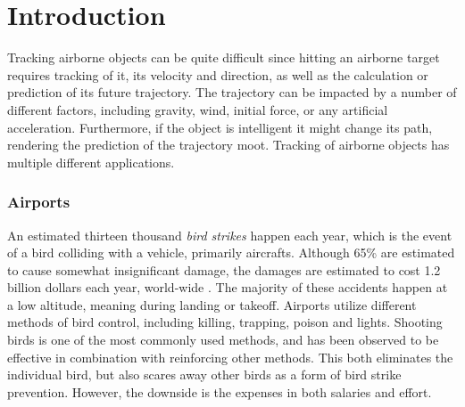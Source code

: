 
\chapter{Introduction}
Tracking airborne objects can be quite difficult since hitting an airborne target requires tracking of it, its velocity and direction, as well as the calculation or prediction of its future trajectory.
The trajectory can be impacted by a number of different factors, including gravity, wind, initial force, or any artificial acceleration.
Furthermore, if the object is intelligent it might change its path, rendering the prediction of the trajectory moot.
Tracking of airborne objects has multiple different applications.

\subsection{Airports}
An estimated thirteen thousand \textit{bird strikes} happen each year, which is the event of a bird colliding with a vehicle, primarily aircrafts\cite{WildlifeStrikeReport}.
Although 65\% are estimated to cause somewhat insignificant damage, the damages are estimated to cost 1.2 billion dollars each year, world-wide \cite{CostOfBirdstrikes}.
The majority of these accidents happen at a low altitude, meaning during landing or takeoff\cite{CostOfBirdstrikes}.
Airports utilize different methods of bird control, including killing, trapping, poison and lights\cite{BirdControlAtAirports}.
Shooting birds is one of the most commonly used methods, and has been observed to be effective in combination with reinforcing other methods.
This both eliminates the individual bird, but also scares away other birds as a form of bird strike prevention.
However, the downside is the expenses in both salaries and effort.

